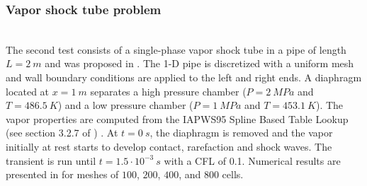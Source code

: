 \documentclass{inputs/mc2015}
\begin{document}
\subsubsection{Vapor shock tube problem} \label{sec:vap-1-phase-shock-tube}
%
 \\
The second test consists of a single-phase vapor shock tube in a pipe of length $L=2 \ m$ and was proposed in \cite{waha-manual, Sokolowski-Koszela}. The 1-D pipe is discretized with a uniform mesh and wall boundary conditions are applied to the left and right ends. A diaphragm located at $x=1 \ m$ separates a high pressure chamber ($P=2 \ MPa$ and $T=486.5 \ K$) and a low pressure chamber ($P=1 \ MPa$ and $T=453.1 \ K$). The vapor properties are computed from the IAPWS95 Spline Based Table Lookup (see section 3.2.7 of \cite{Berry_Peterson_2014})  . At $t=0 \ s$, the diaphragm is removed and the vapor initially at rest starts to develop contact, rarefaction and shock waves. The transient is run until $t=1.5 \cdot 10^{-3} \ s$ with a CFL of 0.1. Numerical results are presented in  for meshes of $100$, $200$, $400$, and $800$ cells.
%
\end{document}
